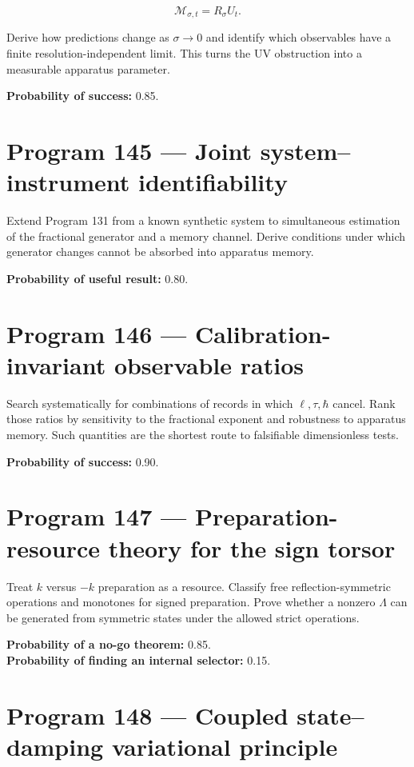\documentclass[11pt,a4paper,openany]{report}
\begin{document}
\[
\mathcal M_{\sigma,t}=R_\sigma U_t.
\]

Derive how predictions change as \(\sigma\to0\) and identify which observables have a finite resolution-independent limit. This turns the UV obstruction into a measurable apparatus parameter.

\textbf{Probability of success:} 0.85.

\section{Program 145 --- Joint system--instrument identifiability}

Extend Program 131 from a known synthetic system to simultaneous estimation of the fractional generator and a memory channel. Derive conditions under which generator changes cannot be absorbed into apparatus memory.

\textbf{Probability of useful result:} 0.80.

\section{Program 146 --- Calibration-invariant observable ratios}

Search systematically for combinations of records in which \(\ell,\tau,\hbar\) cancel. Rank those ratios by sensitivity to the fractional exponent and robustness to apparatus memory. Such quantities are the shortest route to falsifiable dimensionless tests.

\textbf{Probability of success:} 0.90.

\section{Program 147 --- Preparation-resource theory for the sign torsor}

Treat \(k\) versus \(-k\) preparation as a resource. Classify free reflection-symmetric operations and monotones for signed preparation. Prove whether a nonzero \(\Lambda\) can be generated from symmetric states under the allowed strict operations.

\textbf{Probability of a no-go theorem:} 0.85.\\
\textbf{Probability of finding an internal selector:} 0.15.

\section{Program 148 --- Coupled state--damping variational principle}
\end{document}
